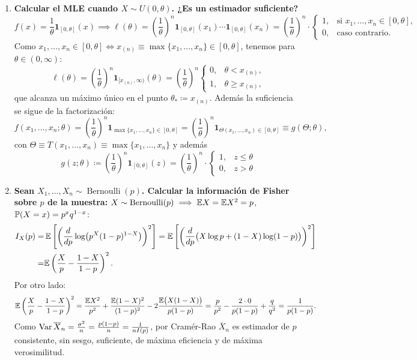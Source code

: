 \begin{enumerate}
  \item \textbf{Calcular el MLE cuando $X \sim U(0, \theta)$. ¿Es un estimador suficiente?}
  \[
    f(x) = \frac{1}{\theta}\mathbf{1}_{[0,\theta]}(x) \implies \ell(\theta) = \left(\frac{1}{\theta}\right)^n \mathbf{1}_{[0,\theta]}(x_1)\cdots\mathbf{1}_{[0,\theta]}(x_n) = \left(\frac{1}{\theta}\right)^n \cdot 
    \begin{cases}
      1, & \text{si } x_1, \dots, x_n \in [0, \theta], \\
      0, & \text{caso contrario.}
    \end{cases}
  \]
  Como $x_1, \dots, x_n \in [0, \theta] \iff x_{(n)} \equiv \max\{x_1, \dots, x_n\} \in [0, \theta]$, tenemos para $\theta \in (0, \infty)$:
  \[
    \ell(\theta) = \left(\frac{1}{\theta}\right)^n \mathbf{1}_{[x_{(n)}, \infty)}(\theta) = \left(\frac{1}{\theta}\right)^n
    \begin{cases}
      0, & \theta < x_{(n)}, \\
      1, & \theta \ge x_{(n)},
    \end{cases}
  \]
  que alcanza un máximo único en el punto $\theta_* \coloneqq x_{(n)}$. Además la suficiencia se sigue de la factorización:
  \[
    f(x_1, \dots, x_n;\theta) = \left(\frac{1}{\theta}\right)^n \mathbf{1}_{\max\{x_1, \dots, x_n\} \in [0,\theta]} = \left(\frac{1}{\theta}\right)^n \mathbf{1}_{\Theta(x_1, \dots, x_n) \in [0,\theta]} \equiv g(\Theta;\theta),
  \]
  con $\Theta \equiv T(x_1, \dots, x_n) \equiv \max\{x_1, \dots, x_n\}$ y adem\'as 
  $$g(z;\theta) \coloneqq \left(\frac{1}{\theta}\right)^n \mathbf{1}_{[0,\theta]}(z) = \left(\frac{1}{\theta}\right)^n\cdot \begin{cases}
     1 , & z \leq \theta \\ 0,  & z > \theta
  \end{cases}$$

  \item \textbf{Sean $X_1, \dots, X_n \sim \operatorname{Bernoulli}(p)$. Calcular la información de Fisher sobre $p$ de la muestra:}
  $X \sim \operatorname{Bernoulli}(p) \implies \mathbb{E} X = \mathbb{E} X^2 = p$, $\mathbb{P}(X = x) = p^x q^{1-x}$:
  \begin{align*}
    I_X(p) = & \, \mathbb{E}\left[\left(\frac{d}{dp}\log\bigl(p^X(1-p)^{1-X}\bigr)\right)^2\right] = \mathbb{E}\left[\left(\frac{d}{dp}\bigl(X\log p + (1-X)\log(1-p)\bigr)\right)^2\right] \\  = & \mathbb{E}\left(\frac{X}{p} - \frac{1-X}{1-p}\right)^2.
  \end{align*}
  Por otro lado:
  \[
    \mathbb{E}\left(\frac{X}{p} - \frac{1-X}{1-p}\right)^2 = \frac{\mathbb{E} X^2}{p^2} + \frac{\mathbb{E}(1-X)^2}{(1-p)^2} - 2\frac{\mathbb{E}\bigl(X(1-X)\bigr)}{p(1-p)} = \frac{p}{p^2} - \frac{2\cdot 0}{p(1-p)} + \frac{q}{q^2} = \frac{1}{p(1-p)}.
  \]
  Como $\operatorname{Var}\overline{X}_n = \frac{\sigma^2}{n} = \frac{p(1-p)}{n} = \frac{1}{n I(p)}$, por Cramér-Rao $\overline{X}_n$ es estimador de $p$ consistente, sin sesgo, suficiente, de máxima eficiencia y de máxima verosimilitud.


\end{enumerate}
